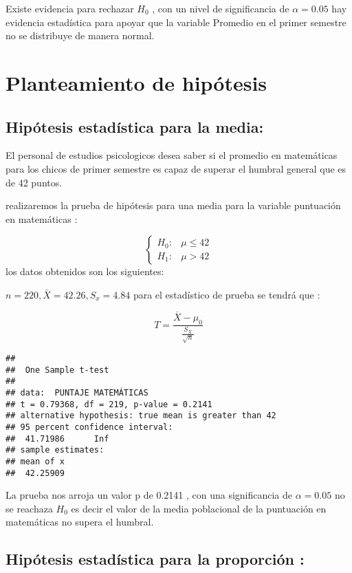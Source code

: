 \documentclass[
  man]{apa6}
\begin{document}
Existe evidencia para rechazar \(H_0\) , con un nivel de significancia de
\(\alpha=0.05\) hay evidencia estadística para apoyar que la variable
Promedio en el primer semestre no se distribuye de manera normal.

\clearpage

\hypertarget{planteamiento-de-hipuxf3tesis}{%
\section{Planteamiento de hipótesis}\label{planteamiento-de-hipuxf3tesis}}

\hypertarget{hipuxf3tesis-estaduxedstica-para-la-media}{%
\subsection{Hipótesis estadística para la media:}\label{hipuxf3tesis-estaduxedstica-para-la-media}}

El personal de estudios psicologicos desea saber si el promedio en
matemáticas para los chicos de primer semestre es capaz de superar el
humbral general que es de 42 puntos.

realizaremos la prueba de hipótesis para una media para la variable
puntuación en matemáticas :

\[
\left\{
\begin{array}{ll}
H_{0}: &  \mu\leq 42\\
H_{1}: & \mu> 42
\end{array}
\right.
\] los datos obtenidos son los siguientes:

\(n=220, \bar{X}=42.26 ,S_x=4.84\) para el estadístico de prueba se tendrá
que :

\[T= \frac{\overline{X}-\mu_{0}}{ \frac{S_X}{\sqrt{n}} }\]

\begin{verbatim}
## 
##  One Sample t-test
## 
## data:  PUNTAJE MATEMÁTICAS
## t = 0.79368, df = 219, p-value = 0.2141
## alternative hypothesis: true mean is greater than 42
## 95 percent confidence interval:
##  41.71986      Inf
## sample estimates:
## mean of x 
##  42.25909
\end{verbatim}

La prueba nos arroja un valor p de 0.2141 , con una significancia de
\(\alpha=0.05\) no se reachaza \(H_0\) es decir el valor de la media
poblacional de la puntuación en matemáticas no supera el humbral.

\hypertarget{hipuxf3tesis-estaduxedstica-para-la-proporciuxf3n}{%
\subsection{Hipótesis estadística para la proporción :}\label{hipuxf3tesis-estaduxedstica-para-la-proporciuxf3n}}
\end{document}
